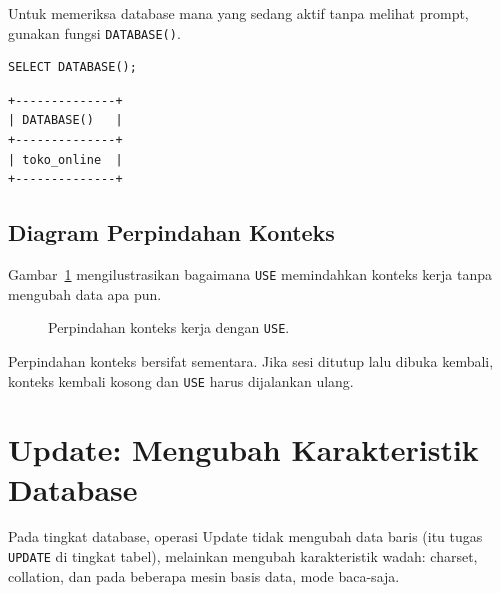 \documentclass[11pt,a4paper]{article}
\begin{document}
Untuk memeriksa database mana yang sedang aktif tanpa melihat prompt, gunakan fungsi \texttt{DATABASE()}.

\begin{lstlisting}[style=code]
SELECT DATABASE();
\end{lstlisting}

\begin{lstlisting}[style=out]
+--------------+
| DATABASE()   |
+--------------+
| toko_online  |
+--------------+
\end{lstlisting}

\subsection{Diagram Perpindahan Konteks}

Gambar~\ref{fig:use-context} mengilustrasikan bagaimana \texttt{USE} memindahkan konteks kerja tanpa mengubah data apa pun.

\begin{figure}[H]
	\centering
	\caption{Perpindahan konteks kerja dengan \texttt{USE}.}
	\label{fig:use-context}
\end{figure}

Perpindahan konteks bersifat sementara. Jika sesi ditutup lalu dibuka kembali, konteks kembali kosong dan \texttt{USE} harus dijalankan ulang.

\section{Update: Mengubah Karakteristik Database}

Pada tingkat database, operasi Update tidak mengubah data baris (itu tugas \texttt{UPDATE} di tingkat tabel), melainkan mengubah karakteristik wadah: charset, collation, dan pada beberapa mesin basis data, mode baca-saja.
\end{document}

